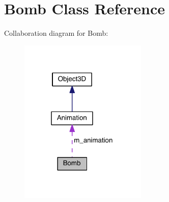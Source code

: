 \hypertarget{class_bomb}{}\section{Bomb Class Reference}
\label{class_bomb}


Collaboration diagram for Bomb\+:\nopagebreak
\begin{figure}[H]
\begin{center}
\leavevmode
\includegraphics[width=172pt]{class_bomb__coll__graph}
\end{center}
\end{figure}
